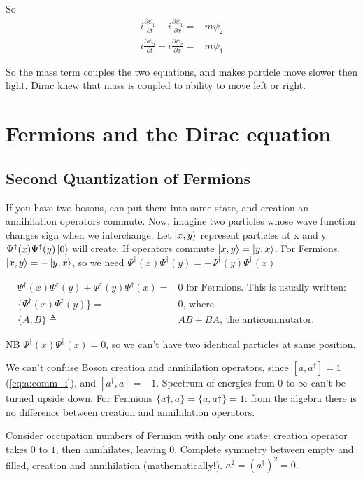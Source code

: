 \documentclass[]{article}
\begin{document}
So
\begin{align*}
i\frac{\partial \psi_1}{\partial t} + i\frac{\partial \psi_1}{\partial x}=&m \psi_2\\
i\frac{\partial \psi_2}{\partial t} - i\frac{\partial \psi_2}{\partial x}=&m \psi_1
\end{align*}

So the mass term couples the two equations, and makes particle move slower then light. Dirac knew that mass is coupled to ability to move left or right.

\section{Fermions and the Dirac equation}

\subsection{Second Quantization of Fermions}

If you have two bosons, can put them into same state, and creation an annihilation operators commute. Now, imagine two particles whose wave function changes sign when we interchange. Let $\ket{x,y}$ represent particles at x and y. $\Psi^\dagger(x)\Psi^\dagger(y)\ket{0}$ will create. If operators commute $\ket{x,y}=\ket{y,x}$. For Fermions, $\ket{x,y}=-\ket{y,x}$, so we need  $\Psi^\dagger(x)\Psi^\dagger(y)= -\Psi^\dagger(y)\Psi^\dagger(x)$
 
\begin{align*}
\Psi^\dagger(x)\Psi^\dagger(y)+\Psi^\dagger(y)\Psi^\dagger(x)=&0 \text{ for Fermions. This is usually written:}\\
\{\Psi^\dagger(x)\Psi^\dagger(y)\}=&0 \text{, where}\\
\{A,B\}\triangleq& AB + BA \text{, the anticommutator.}
\end{align*}

NB  $\Psi^\dagger(x)\Psi^\dagger(x)=0$,  so we can't have two identical particles at same position.

We can't confuse Boson creation and annihilation operators, since $[a,a^\dagger]=1$ (\ref{eq:a:comm_i}), and $[a^\dagger,a]=-1$. Spectrum of energies from $0$ to $\infty$ can't be turned upside down. For Fermions $\{a\dagger,a\}= \{a,a\dagger\}=1$: from the algebra there is no difference between creation and annihilation operators.

Consider occupation numbers of Fermion with only one state: creation operator takes $0$ to $1$, then annihilates, leaving 0. Complete symmetry between empty and filled, creation and annihilation (mathematically!). $a^2=(a^\dagger)^2=0$.
\end{document}
